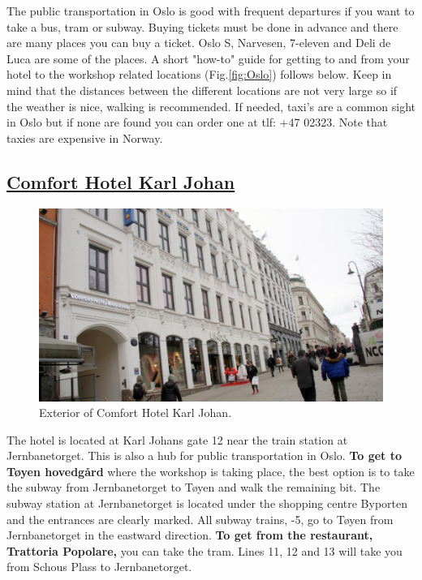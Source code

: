\documentclass{article}
\begin{document}
The public transportation in Oslo is good with frequent
departures if you want
to take a bus, tram or subway. Buying tickets must be
done in advance and there are many places you can buy a
ticket. Oslo S, Narvesen, 7-eleven and Deli de Luca are some of the places.
A short "how-to" guide for getting to and from your hotel
 to the workshop related
locations (Fig.\ref{fig:Oslo}) follows below. Keep in mind that
the distances
between the different locations are not very large so if the
weather is nice, walking is recommended. If needed, taxi's
are a common sight in Oslo but if none are found you can order one
at tlf: +47 02323. Note that taxies are expensive in Norway.


\subsection*{\underline{Comfort Hotel Karl Johan}}

\begin{figure}
\centering
\includegraphics[scale=0.2]{img/comfort_karl_johan.jpg}
\caption{\label{fig:frog1}Exterior of Comfort Hotel Karl Johan.}
\end{figure}
The hotel is located at Karl Johans gate 12 near
the train station at Jernbanetorget.
This is also
a hub for public transportation in Oslo. \textbf{To get to
Tøyen hovedgård} where the workshop is taking place,
the best option is to take the subway from Jernbanetorget
to Tøyen and walk the remaining bit. The subway station
at Jernbanetorget is located under the shopping centre
Byporten and the entrances are clearly marked.
All subway trains,
-5, go to Tøyen from
Jernbanetorget in the eastward direction. \textbf{To get from
the restaurant, Trattoria Popolare,} you can take the tram. Lines
11, 12 and 13 will take you from Schous Plass to Jernbanetorget.
\end{document}
